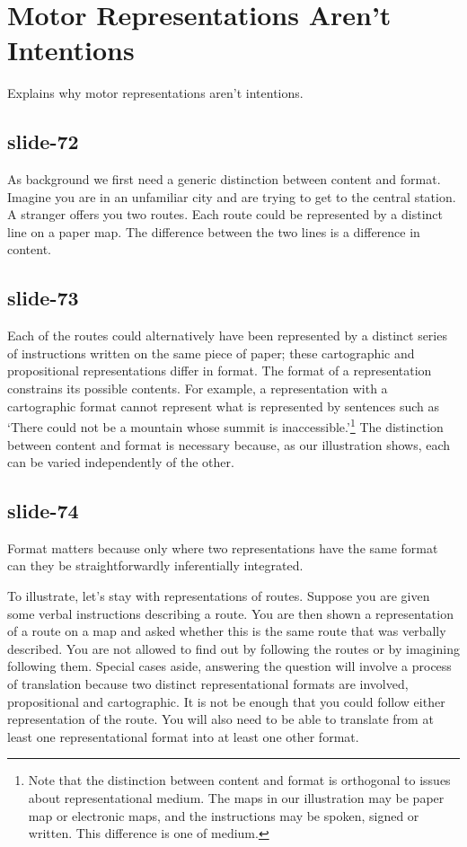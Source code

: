 \documentclass[12pt,\papersize]{extarticle}
\begin{document}
 
\section{Motor Representations Aren’t Intentions}
 
Explains why motor representations aren’t intentions.
 
\subsection{slide-72}
As background we first need a generic distinction between content and format.
Imagine you are in an unfamiliar city and are trying to get to the central station.
A stranger offers you two routes. Each route could be represented by a distinct line
on a paper map. The difference between the two lines is a difference in content.
 
\subsection{slide-73}
Each of the routes could alternatively have been represented by a distinct series
of instructions written on the same piece of paper; these cartographic and
propositional representations differ in format. The format of a representation
constrains its possible contents. For example, a representation with a cartographic
format cannot represent what is represented by sentences such as `There could not be a
mountain whose summit is inaccessible.'\footnote{ Note that the distinction between
content and format is orthogonal to issues about representational medium. The maps in
our illustration may be paper map or electronic maps, and the instructions may be spoken,
signed or written. This difference is one of medium.} The distinction between content and
format is necessary because, as our illustration shows, each can be varied independently
of the other.
 
\subsection{slide-74}
Format matters because only where two representations have the same format can they be straightforwardly inferentially integrated.
 
To illustrate, let’s stay with representations of routes.
Suppose you are given some verbal instructions describing a route. You are then shown a representation of a route on a map and asked whether this is the same route that was verbally described. You are not allowed to find out by following the routes or by imagining following them.
Special cases aside, answering the question will involve a process of translation because two distinct representational formats are involved, propositional and cartographic. It is not be enough that you could follow either representation of the route. You will also need to be able to translate from at least one representational format into at least one other format.
 
\end{document}
